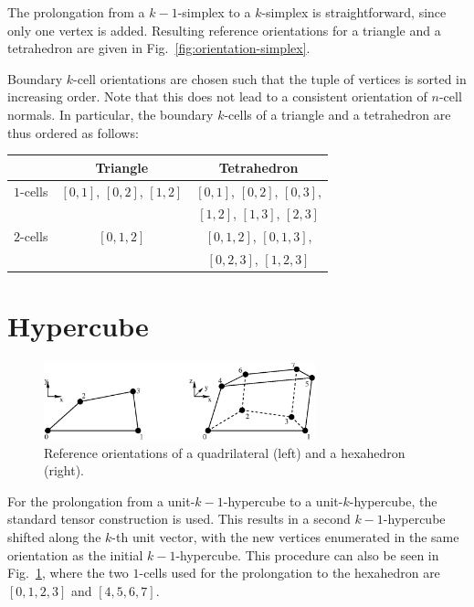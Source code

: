 The prolongation from a $k-1$-simplex to a $k$-simplex is straightforward, since only one vertex is added.
Resulting reference orientations for a triangle and a tetrahedron are given in Fig.~\ref{fig:orientation-simplex}.

Boundary $k$-cell orientations are chosen such that the tuple of vertices is sorted in increasing order.
Note that this does not lead to a consistent orientation of $n$-cell normals. In particular,
the boundary $k$-cells of a triangle and a tetrahedron are thus ordered as follows:
\begin{center}
 \begin{tabular}{|l|c|c|}
  \hline
              & Triangle                  & Tetrahedron   \\
  \hline
   $1$-cells  & $[0,1]$, $[0,2]$, $[1,2]$ & $[0, 1]$, $[0, 2]$, $[0,3]$, \\
              &                           & $[1, 2]$, $[1, 3]$, $[2,3]$ \\
  \hline
   $2$-cells  & $[0,1,2]$                 & $[0,1,2]$, $[0,1,3]$, \\
              &                           & $[0,2,3]$, $[1,2,3]$ \\
  \hline
 \end{tabular}

\end{center}


\section{Hypercube}
\begin{figure}[tb]
\centering
 \includegraphics[width=0.7\textwidth]{figures/orientation-hypercube.eps}
 \caption{Reference orientations of a quadrilateral (left) and a hexahedron (right).}
 \label{fig:orientation-hypercube}
\end{figure}

For the prolongation from a unit-$k-1$-hypercube to a unit-$k$-hypercube, the standard tensor
construction is used. This results in a second $k-1$-hypercube shifted along the $k$-th unit vector,
with the new vertices enumerated in the same orientation as the initial $k-1$-hypercube.
This procedure can also be seen in Fig.~\ref{fig:orientation-hypercube}, where
the two $1$-cells used for the prolongation to the hexahedron are $[0,1,2,3]$ and $[4,5,6,7]$.

